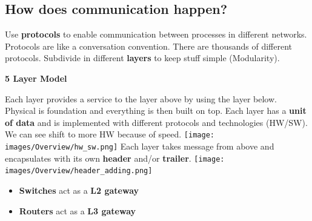 \documentclass[a4paper, fontsize=8pt, landscape, DIV=1]{scrartcl}
\begin{document}
\begin{multicols*}{4}
				\subsection{How does communication happen?}
				Use \textbf{protocols} to enable communication between processes in different networks. Protocols are like a conversation convention. There are thousands of different protocols. Subdivide in different \textbf{layers} to keep stuff simple (Modularity).
				\begin{center}
					\textbf{5 Layer Model}\\
				\end{center}
				\par 
				Each layer provides a service to the layer above by using the layer below. Physical is foundation and everything is then built on top. 
				Each layer has a \textbf{unit of data} and is implemented with different protocols and technologies (HW/SW). We can see shift to more HW because of speed. 
				\texttt{[image: images/Overview/hw\_sw.png]}
				Each layer takes message from above and encapsulates with its own \textbf{header} and/or \textbf{trailer}. 
				\texttt{[image: images/Overview/header\_adding.png]}
				\begin{itemize}[noitemsep]
					\item \textbf{Switches} act as a \textbf{L2 gateway}
					\item \textbf{Routers} act as a \textbf{L3 gateway}
				\end{itemize}
			

\end{multicols*}
\end{document}

